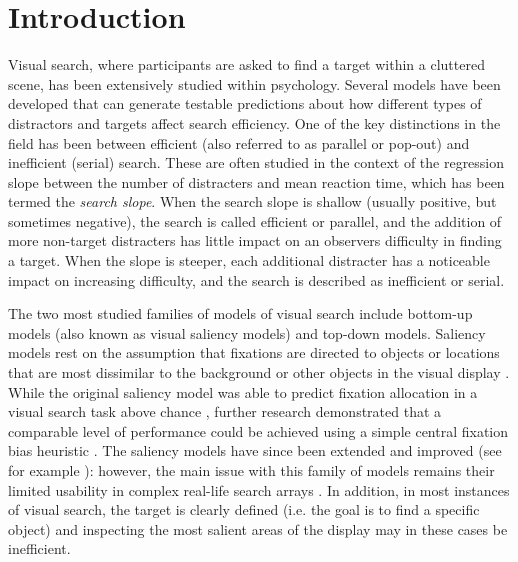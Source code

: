 \documentclass[smallextended, natbib]{svjour3}       %
\begin{document}
\section{Introduction}
\label{intro}

Visual search, where participants are asked to find a target within a cluttered scene, has been extensively studied within psychology. Several models have been developed that can generate testable predictions about how different types of distractors and targets affect search efficiency. One of the key distinctions in the field has been between efficient (also referred to as parallel or pop-out) and inefficient (serial) search. These are often studied in the context of the regression slope between the number of distracters and mean reaction time, which has been termed the \textit{search slope}. When the search slope is shallow (usually positive, but sometimes negative), the search is called efficient or parallel, and the addition of more non-target distracters has little impact on an observers difficulty in finding a target. When the slope is steeper, each additional distracter has a noticeable impact on increasing difficulty, and the search is described as inefficient or serial. 

The two most studied families of models of visual search include bottom-up models (also known as visual saliency models) and top-down models. Saliency models rest on the assumption that fixations are directed to objects or locations that are most dissimilar to the background or other objects in the visual display \citep{itti2000saliency, itti1998model, koch1987shifts}. While the original saliency model was able to predict fixation allocation in a visual search task above chance \citep{parkhurst2002modeling}, further research demonstrated that a comparable level of performance could be achieved using a simple central fixation bias heuristic \citep{tatler2007central}. The saliency models have since been extended and improved (see for example \cite{zhang2008sun}): however, the main issue with this family of models remains their limited usability in complex real-life search arrays \citep{tatler2011eye, koehler2014saliency}. In addition, in most instances of visual search, the target is clearly defined (i.e. the goal is to find a specific object) and inspecting the most salient areas of the display may in these cases be inefficient.
\end{document}

